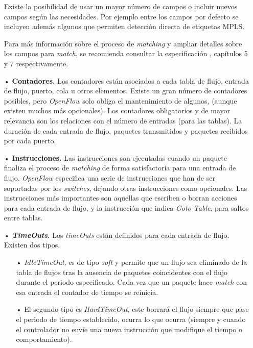 \documentclass[a4paper,11pt]{book}
\begin{document}
\begin{itemize}
Existe la posibilidad de usar un mayor número de campos o incluir nuevos campos según las necesidades. Por ejemplo entre los campos por defecto se incluyen además algunos que permiten detección directa de etiquetas \ac{MPLS}.

Para más información sobre el proceso de \textit{matching} y ampliar detalles sobre los campos para \textit{match}, se recomienda consultar la especificación \cite{openflow13}, capítulos 5 y 7 respectivamente.


\item[•] \textbf{Contadores.} Los contadores están asociados a cada tabla de flujo, entrada de flujo, puerto, cola u otros elementos. Existe un gran número de contadores posibles, pero \emph{OpenFlow} solo obliga el mantenimiento de algunos, (aunque existen muchos más opcionales). Los contadores obligatorios y de mayor relevancia son los relaciones con el número de entradas (para las tablas). La duración de cada entrada de flujo, paquetes transmitidos y  paquetes recibidos por cada puerto.

\item[•] \textbf{Instrucciones.} Las instrucciones son ejecutadas cuando un paquete finaliza el proceso de \textit{matching} de forma satisfactoria para una entrada de flujo. \emph{OpenFlow} especifica una serie de instrucciones que han de ser soportadas por los \textit{switches}, dejando otras instrucciones como opcionales. Las instrucciones más importantes son aquellas que escriben o borran acciones para cada entrada de flujo, y la instrucción que indica \textit{Goto-Table}, para saltos entre tablas.

\item[•] \textbf{\textit{TimeOuts}.} Los \textit{timeOuts} están definidos para cada entrada de flujo. Existen dos tipos.

\begin{itemize}
\item[•] \textit{IdleTimeOut}, es de tipo \textit{soft} y permite que un flujo sea eliminado de la tabla de flujos tras la ausencia de paquetes coincidentes con el flujo durante el periodo especificado. Cada vez que un paquete hace \textit{match} con esa entrada el contador de tiempo se reinicia.
\item[•] El segundo tipo es \textit{HardTimeOut}, este borrará el flujo siempre que pase el periodo de tiempo establecido, ocurra lo que ocurra (siempre y cuando el controlador no envíe una nueva instrucción que modifique el tiempo o comportamiento).
\end{itemize}
\end{itemize}
\end{document}
